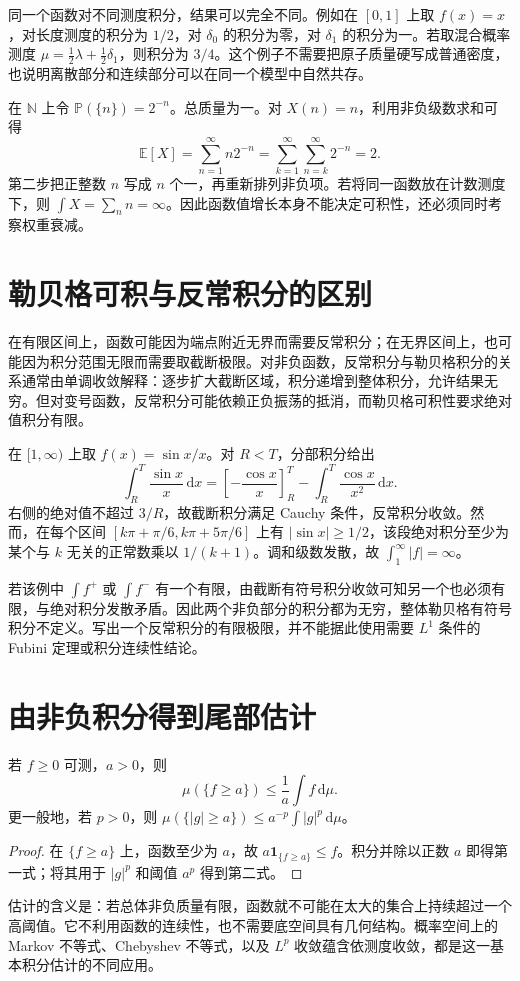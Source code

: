 同一个函数对不同测度积分，结果可以完全不同。例如在 $[0,1]$ 上取 $f(x)=x$，对长度测度的积分为 $1/2$，对 $\delta_0$ 的积分为零，对 $\delta_1$ 的积分为一。若取混合概率测度 $\mu=\tfrac12\lambda+\tfrac12\delta_1$，则积分为 $3/4$。这个例子不需要把原子质量硬写成普通密度，也说明离散部分和连续部分可以在同一个模型中自然共存。

\begin{example}[具有不同权重的可数模型]
在 $\mathbb N$ 上令 $\mathbb P(\{n\})=2^{-n}$。总质量为一。对 $X(n)=n$，利用非负级数求和可得
\[
 \mathbb E[X]=\sum_{n=1}^{\infty}n2^{-n}
 =\sum_{k=1}^{\infty}\sum_{n=k}^{\infty}2^{-n}=2.
\]
第二步把正整数 $n$ 写成 $n$ 个一，再重新排列非负项。若将同一函数放在计数测度下，则 $\int X=\sum_nn=\infty$。因此函数值增长本身不能决定可积性，还必须同时考察权重衰减。
\end{example}

\section{勒贝格可积与反常积分的区别}
在有限区间上，函数可能因为端点附近无界而需要反常积分；在无界区间上，也可能因为积分范围无限而需要取截断极限。对非负函数，反常积分与勒贝格积分的关系通常由单调收敛解释：逐步扩大截断区域，积分递增到整体积分，允许结果无穷。但对变号函数，反常积分可能依赖正负振荡的抵消，而勒贝格可积性要求绝对值积分有限。

\begin{example}[条件收敛的反常积分不等于勒贝格可积]
在 $[1,\infty)$ 上取 $f(x)=\sin x/x$。对 $R<T$，分部积分给出
\[
 \int_R^T\frac{\sin x}{x}\,\mathrm dx
 =\left[-\frac{\cos x}{x}\right]_R^T-\int_R^T\frac{\cos x}{x^2}\,\mathrm dx.
\]
右侧的绝对值不超过 $3/R$，故截断积分满足 Cauchy 条件，反常积分收敛。然而，在每个区间
$[k\pi+\pi/6,k\pi+5\pi/6]$ 上有 $|\sin x|\geq1/2$，该段绝对积分至少为某个与 $k$ 无关的正常数乘以 $1/(k+1)$。调和级数发散，故 $\int_1^\infty|f|=\infty$。
\end{example}

若该例中 $\int f^+$ 或 $\int f^-$ 有一个有限，由截断有符号积分收敛可知另一个也必须有限，与绝对积分发散矛盾。因此两个非负部分的积分都为无穷，整体勒贝格有符号积分不定义。写出一个反常积分的有限极限，并不能据此使用需要 $L^1$ 条件的 Fubini 定理或积分连续性结论。

\section{由非负积分得到尾部估计}
\begin{proposition}
若 $f\geq0$ 可测，$a>0$，则
\[
 \mu(\{f\geq a\})\leq\frac1a\int f\,\mathrm d\mu.
\]
更一般地，若 $p>0$，则
$\mu(\{|g|\geq a\})\leq a^{-p}\int|g|^p\,\mathrm d\mu$。
\label{prop:mt-markov}
\end{proposition}
\begin{proof}
在 $\{f\geq a\}$ 上，函数至少为 $a$，故 $a\mathbf1_{\{f\geq a\}}\leq f$。积分并除以正数 $a$ 即得第一式；将其用于 $|g|^p$ 和阈值 $a^p$ 得到第二式。
\end{proof}
估计的含义是：若总体非负质量有限，函数就不可能在太大的集合上持续超过一个高阈值。它不利用函数的连续性，也不需要底空间具有几何结构。概率空间上的 Markov 不等式、Chebyshev 不等式，以及 $L^p$ 收敛蕴含依测度收敛，都是这一基本积分估计的不同应用。

